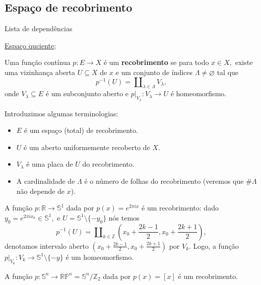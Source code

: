 \subsection{Espaço de recobrimento}
\label{espaco-de-recobrimento-def}
\begin{titlemize}{Lista de dependências}
	\item \hyperref[topologia-quociente]{Espaço quciente};\\ %
\end{titlemize}
\begin{defi}
Uma função contínua $p:E\rightarrow X$ é um \textbf{recobrimento} se para todo $x\in X,$ existe uma vizinhança aberta $U\subseteq X$ de $x$ e um conjunto de índices $\Lambda\ne \varnothing$ tal que 
$$p^{-1}(U)=\amalg_{\lambda\in \Lambda} V_\lambda,$$
onde $V_\lambda\subseteq E$ é um subconjunto aberto e $p|_{V_\lambda}:V_\lambda\rightarrow U$ é homeomorfismo.
\end{defi}

\begin{nota}
Introduzimos algumas terminologias: 
    \begin{itemize}
        \item $E$ é um espaço (total) de recobrimento.
        \item $U$ é um aberto uniformemente recoberto de $X.$
        \item $V_\lambda$ é uma placa de $U$ do recobrimento.
        \item A cardinalidade de $\Lambda$ é o número de folhas do recobrimento (veremos que $\# \Lambda$ não depende de $x$). 
    \end{itemize}
\end{nota}

\begin{ex}
A função $p:\mathbb{R}\rightarrow \mathbb{S}^1$ dada por $p(x)=e^{2\pi ix}$ é um recobrimento: dado $y_0=e^{2\pi i x_0}\in\mathbb{S}^1,$ e $U=\mathbb{S}^1\setminus \{-y_0\}$ nós temos 
$$p^{-1}(U)=\amalg_{k\in \mathbb{Z}} (x_0+\frac{2k-1}{2},x_0+\frac{2k+1}{2}),$$
denotamos intervalo aberto $(x_0+\frac{2k-1}{2},x_0+\frac{2k+1}{2})$ por $V_k.$ Logo, a função $p|_{V_k}:V_k\rightarrow \mathbb{S}^1\setminus\{-y\}$ é um homeomorfismo.
\end{ex}

\begin{ex}
    A função $p:\mathbb{S}^n\rightarrow \mathbb{RP}^n=\mathbb{S}^n/\mathbb{Z}_2$ dada por $p(x)=[x]$ é um recobrimento.
\end{ex}

